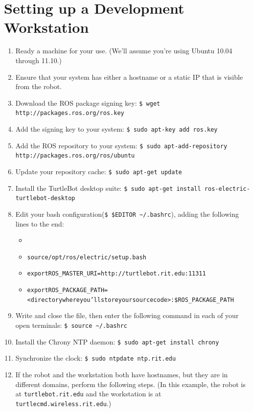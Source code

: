 \documentclass[12pt]{report}
\begin{document}
\section{Setting up a Development Workstation}
\begin{sloppypar}
\begin{enumerate}
\item{Ready a machine for your use.  (We'll assume you're using Ubuntu 10.04 through 11.10.)}
\item{Ensure that your system has either a hostname or a static IP that is visible from the robot.}
\item{Download the ROS package signing key: \texttt{\$\ wget http://packages.ros.org/ros.key}}
\item{Add the signing key to your system: \texttt{\$\ sudo apt-key add ros.key}}
\item{Add the ROS repository to your system: \texttt{\$\ sudo apt-add-repository http://packages.ros.org/ros/ubuntu}}
\item{Update your repository cache: \texttt{\$\ sudo apt-get update}}
\item{Install the TurtleBot desktop suite: \texttt{\$\ sudo apt-get install ros-electric-turtlebot-desktop}}
\item{Edit your bash configuration(\texttt{\$\ \$EDITOR \~{}/.bashrc}), adding the following lines to the end:}
\begin{alltt}
\begin{itemize}
\item{}
\item{source /opt/ros/electric/setup.bash}
\item{export ROS\_MASTER\_URI=http://turtlebot.rit.edu:11311}
\item{export ROS\_PACKAGE\_PATH=<directory\- where\- you'll\- store\- your\- source\- code>:\$ROS\_PACKAGE\_PATH}
\end{itemize}
\end{alltt}
\item{Write and close the file, then enter the following command in each of your open terminals: \texttt{\$\ source \~{}/.bashrc}}
\item{Install the Chrony NTP daemon: \texttt{\$\ sudo apt-get install chrony}}
\item{Synchronize the clock: \texttt{\$\ sudo ntpdate ntp.rit.edu}}
\item{If the robot and the workstation both have hostnames, but they are in different domains, perform the following steps.  (In this example, the robot is at \texttt{turtlebot.rit.edu} and the workstation is at \texttt{turtlecmd.wireless.rit.edu}.)}

\end{enumerate}
\end{sloppypar}
\end{document}
